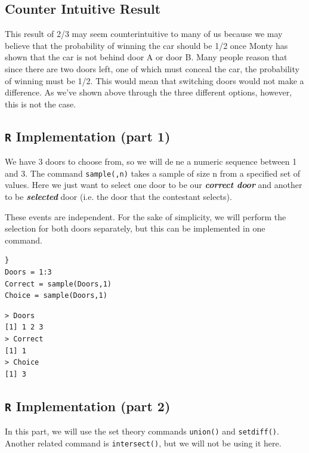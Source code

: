 \documentclass[11pt]{article} %
\begin{document}
\subsection{Counter Intuitive Result}
This result of 2/3 may seem counterintuitive to many of us because we may believe that the probability of winning the car should be 1/2 once Monty has shown that the car is not behind door A or door B. Many people reason that since there are two doors left, one of which must conceal the car, the probability of winning must be 1/2. This would mean that switching doors would not make a difference. As we've shown above through the three different options, however, this is not the case.


\subsection{ \texttt{R} Implementation (part 1)}
We have 3 doors to choose from, so we will dene a numeric sequence between 1 and 3. The
command \texttt{sample(,n)} takes a sample of size n from a specified set of values. Here we just
want to select one door to be our \textbf{\textit{correct door}} and another to be \textbf{\textit{selected}} door (i.e. the door that the contestant selects).

These events are independent. For the sake of simplicity, we will perform the selection for both doors separately, but this can be implemented in one command.
\begin{framed}
\begin{verbatim}}
Doors = 1:3 
Correct = sample(Doors,1)
Choice = sample(Doors,1)
\end{verbatim}
\end{framed}


\begin{verbatim}
> Doors
[1] 1 2 3
> Correct
[1] 1
> Choice
[1] 3
\end{verbatim}

\newpage
\subsection{ \texttt{R} Implementation (part 2)}
In this part, we will use the set theory commands \texttt{union()} and \texttt{setdiff()}. Another related command is \texttt{intersect()}, but we will not be using it here.
\end{document}
